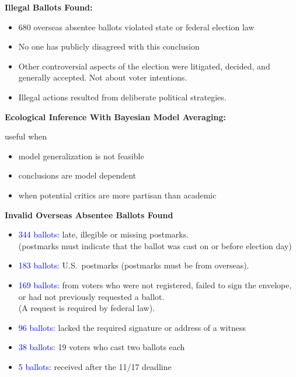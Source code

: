 \documentclass[landscape,letterpaper]{seminar}
\newcommand{\heading}[1]{%
\begin{center}
\large\bf\shadowbox{#1}
\end{center}
\vspace{1ex minus 1ex}}
\begin{document}
\begin{slide}
\heading{Overview}
\smallskip

{\bf Illegal Ballots Found:} 
\begin{itemize}
\item 680 overseas absentee ballots violated state or federal election
  law
\item No one has publicly disagreed with this conclusion
\item Other controversial aspects of the election were litigated,
  decided, and generally accepted.  Not about voter intentions.
\item Illegal actions resulted from  deliberate political
    strategies.
\end{itemize}

\bigskip

{\bf Ecological Inference With Bayesian Model Averaging:} 

\hspace{0.1in} useful when
\begin{itemize}
\item model generalization is not feasible
\item conclusions are model dependent
\item when potential critics are more partisan than academic
\end{itemize}

\end{slide}


\begin{slide}
\centerline{\textbf{Invalid Overseas Absentee Ballots Found}}
\bigskip

\begin{itemize}
\item \textcolor{Blue}{344 ballots:} late, illegible or missing
  postmarks. \\ (postmarks must indicate that the ballot was cast on
  or before election day)
\item \textcolor{Blue}{183 ballots:} U.S.\ postmarks (postmarks must 
  be from overseas).
\item \textcolor{Blue}{169 ballots:} from voters who 
  were not registered, failed to sign
  the envelope, or had not previously requested a ballot. \\ (A
  request is required by federal law).
\item \textcolor{Blue}{96 ballots:} lacked the required signature or address of a witness
\item \textcolor{Blue}{38 ballots:} 19 voters who cast two ballots each
\item \textcolor{Blue}{5 ballots:} received after the 11/17 deadline
\end{itemize}

\end{slide}
\end{document}
